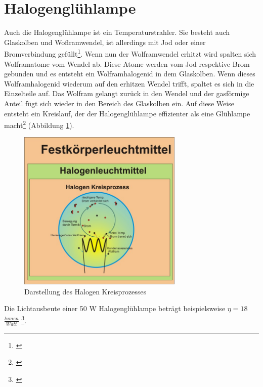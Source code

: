 \section{Halogenglühlampe} \label{sec_halogenglühlampe}
Auch die Halogenglühlampe ist ein Temperaturstrahler. Sie besteht auch Glaskolben und Woflramwendel, ist allerdings mit Jod oder einer Bromverbindung gefüllt\footnote{\cite[82]{ris}}.
Wenn nun der Wolframwendel erhitzt wird spalten sich Wolframatome vom Wendel ab. Diese Atome werden vom Jod respektive Brom gebunden und es entsteht ein Wolframhalogenid in dem Glaskolben. Wenn dieses Wolframhalogenid wiederum auf den erhitzen Wendel trifft, spaltet es sich in die Einzelteile auf. Das Wolfram gelangt zurück in den Wendel und der gasförmige Anteil fügt sich wieder in den Bereich des Glaskolben ein. Auf diese Weise entsteht ein Kreislauf, der der Halogenglühlampe effizienter als eine Glühlampe macht\footnote{\cite[83-84]{ris}} (Abbildung \ref{b_halogenkreis}).

\begin{figure}[htp]     %
\centering
\includegraphics[width=0.7\textwidth]{bilder/halogenkreis} 
\caption {Darstellung des Halogen Kreisprozesses\protect\footnotemark}\label{b_halogenkreis}
\end{figure}

\noindent Die Lichtausbeute einer 50 W Halogenglühlampe beträgt beispielsweise $\eta=18$ $\frac{lumen}{Watt}$ \footnote{\cite[35]{greule}}.

